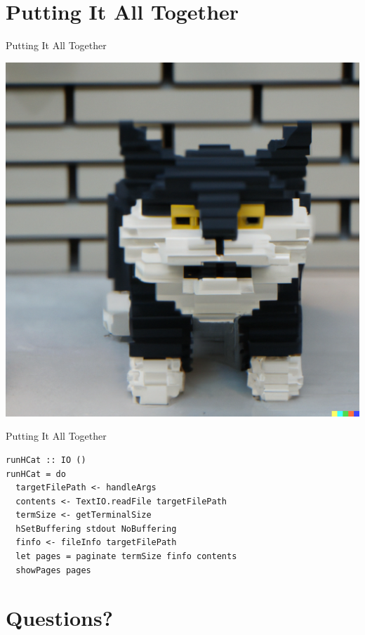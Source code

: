 \documentclass[10pt, presentation, colorlinks]{beamer}
\begin{document}
\section{Putting It All Together}
\label{sec:org5d5a147}

\begin{frame}[label={sec:org9f9f494}]{Putting It All Together}
\begin{center}
\includegraphics[height=0.5\textheight]{img/cat.png}
\end{center}
\end{frame}

\begin{frame}[label={sec:orgcbcdd43},fragile]{Putting It All Together}
 \begin{verbatim}
runHCat :: IO ()
runHCat = do
  targetFilePath <- handleArgs
  contents <- TextIO.readFile targetFilePath
  termSize <- getTerminalSize
  hSetBuffering stdout NoBuffering
  finfo <- fileInfo targetFilePath
  let pages = paginate termSize finfo contents
  showPages pages
\end{verbatim}
\end{frame}

\section{Questions?}
\label{sec:orgd923891}
\end{document}
